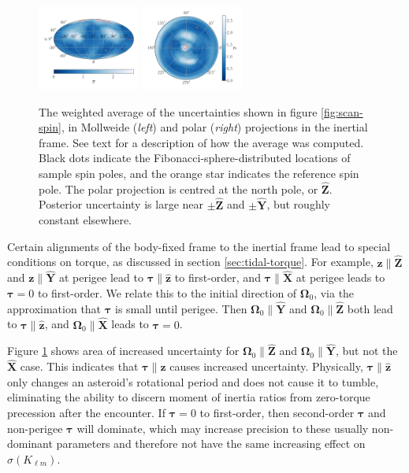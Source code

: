 \documentclass[fleqn,usenatbib]{mnras}
\newcommand{\unit}[1]{\bm{\hat{#1}}}
\begin{document}
\begin{figure}
  \centering
  \includegraphics[width=0.3\textwidth]{figs/spin-pole-avg-mollweide.png}
  \includegraphics[width=0.3\textwidth]{figs/spin-pole-avg-polar.png}
  \caption{The weighted average of the uncertainties shown in figure \ref{fig:scan-spin}, in Mollweide (\textit{left}) and polar (\textit{right}) projections in the inertial frame. See text for a description of how the average was computed. Black dots indicate the Fibonacci-sphere-distributed locations of sample spin poles, and the orange star indicates the reference spin pole. The polar projection is centred at the north pole, or $\unit Z$. Posterior uncertainty is large near $\pm \unit Z$ and $\pm \unit Y$, but roughly constant elsewhere.}
  \label{fig:scan-spin-avg}
\end{figure}

Certain alignments of the body-fixed frame to the inertial frame lead to special conditions on torque, as discussed in section \ref{sec:tidal-torque}. For example, $\bm z \parallel \unit Z$ and $\bm z \parallel \unit Y$ at perigee lead to $\bm \tau \parallel \unit z$ to first-order, and $\bm \tau \parallel \unit X$ at perigee leads to $\bm \tau = 0$ to first-order. We relate this to the initial direction of $\bm \Omega_0$, via the approximation that $\bm \tau$ is small until perigee. Then $\bm \Omega_0 \parallel \unit Y$ and $\bm \Omega_0 \parallel \unit Z$ both lead to $\bm \tau \parallel \unit z$, and $\bm \Omega_0 \parallel \unit X$ leads to $\bm \tau = 0$.

Figure \ref{fig:scan-spin-avg} shows area of increased uncertainty for $\bm \Omega_0 \parallel \unit Z$ and $\bm \Omega_0 \parallel \unit Y$, but not the $\unit X$ case. This indicates that $\bm \tau \parallel \unit z$ causes increased uncertainty. Physically, $\bm \tau \parallel \unit z$ only changes an asteroid's rotational period and does not cause it to tumble, eliminating the ability to discern moment of inertia ratios from zero-torque precession after the encounter. If $\bm \tau = 0$ to first-order, then second-order $\bm \tau$ and non-perigee $\bm \tau$ will dominate, which may increase precision to these usually non-dominant parameters and therefore not have the same increasing effect on $\sigma(K_{\ell m})$.
\end{document}
